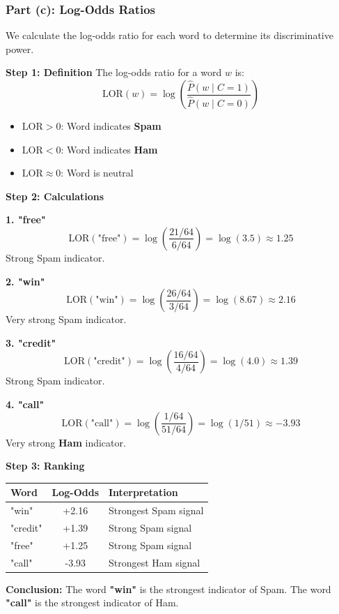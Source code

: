 \documentclass[12pt]{article}
\begin{document}
\subsubsection{Part (c): Log-Odds Ratios}

\begin{solution}
We calculate the log-odds ratio for each word to determine its discriminative power.

\textbf{Step 1: Definition}
The log-odds ratio for a word $w$ is:
\[
\text{LOR}(w) = \log \left( \frac{\hat{P}(w \mid C=1)}{\hat{P}(w \mid C=0)} \right)
\]
\begin{itemize}
    \item $\text{LOR} > 0$: Word indicates \textbf{Spam}
    \item $\text{LOR} < 0$: Word indicates \textbf{Ham}
    \item $\text{LOR} \approx 0$: Word is neutral
\end{itemize}

\textbf{Step 2: Calculations}

\textbf{1. "free"}
\[
\text{LOR}(\text{"free"}) = \log \left( \frac{21/64}{6/64} \right) = \log(3.5) \approx \mathbf{1.25}
\]
Strong Spam indicator.

\textbf{2. "win"}
\[
\text{LOR}(\text{"win"}) = \log \left( \frac{26/64}{3/64} \right) = \log(8.67) \approx \mathbf{2.16}
\]
Very strong Spam indicator.

\textbf{3. "credit"}
\[
\text{LOR}(\text{"credit"}) = \log \left( \frac{16/64}{4/64} \right) = \log(4.0) \approx \mathbf{1.39}
\]
Strong Spam indicator.

\textbf{4. "call"}
\[
\text{LOR}(\text{"call"}) = \log \left( \frac{1/64}{51/64} \right) = \log(1/51) \approx \mathbf{-3.93}
\]
Very strong \textbf{Ham} indicator.

\textbf{Step 3: Ranking}

\begin{center}
\begin{tabular}{|l|c|l|}
\hline
\textbf{Word} & \textbf{Log-Odds} & \textbf{Interpretation} \\
\hline
"win" & +2.16 & Strongest Spam signal \\
"credit" & +1.39 & Strong Spam signal \\
"free" & +1.25 & Strong Spam signal \\
"call" & -3.93 & Strongest Ham signal \\
\hline
\end{tabular}
\end{center}

\textbf{Conclusion:}
The word \textbf{"win"} is the strongest indicator of Spam. The word \textbf{"call"} is the strongest indicator of Ham.
\end{solution}
\end{document}
